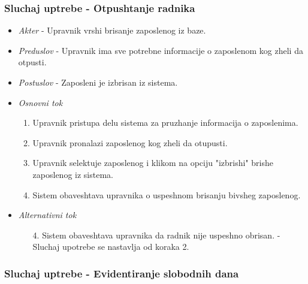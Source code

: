 \documentclass[10 pt]{article}
\begin{document}
	\subsubsection{Sluchaj uptrebe - Otpushtanje radnika}
		
		\begin{itemize}
			\item\textit{Akter} - Upravnik vrshi brisanje zaposlenog iz baze.
			
			\item\textit{Preduslov} - Upravnik ima sve potrebne informacije o zaposlenom kog zheli da otpusti.

			
			\item\textit{Postuslov} - Zaposleni je izbrisan iz sistema.

			
			\item\textit{Osnovni tok}
				\begin{enumerate}
					\item Upravnik pristupa delu sistema za pruzhanje informacija o zaposlenima.

					\item Upravnik pronalazi zaposlenog kog zheli da otupusti.

					\item Upravnik selektuje zaposlenog i klikom na opciju "izbrishi" brishe zaposlenog iz sistema.

					\item Sistem obaveshtava upravnika o uspeshnom brisanju bivsheg zaposlenog.

				\end{enumerate}
			
			\item\textit{Alternativni tok}
				\begin{enumerate}
					\item [4.] Sistem obaveshtava upravnika da radnik nije uspeshno obrisan. - Sluchaj upotrebe se nastavlja  od koraka 2.

				\end{enumerate}
			
		\end{itemize}
		
		
	\subsubsection{Sluchaj uptrebe - Evidentiranje slobodnih dana}
	
\end{document}
